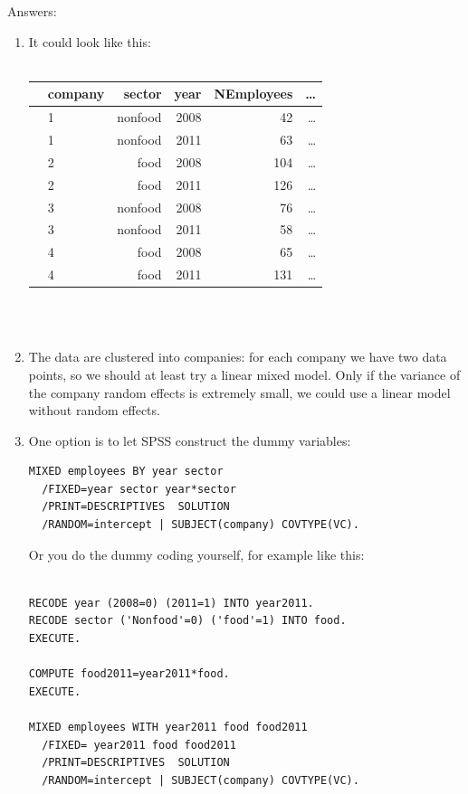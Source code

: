\documentclass[]{report}\usepackage[]{graphicx}\usepackage[]{color}
\begin{document}
Answers:
\\
\begin{enumerate}
\item It could look like this:
\\
\\
\begin{tabular}{llrrrr}
   & company & sector  & year & NEmployees  & \dots  \\ \hline
  & 1 & nonfood  & 2008 & 42  & \dots  \\
  & 1 & nonfood  & 2011 & 63  & \dots  \\
  & 2 & food  & 2008 & 104  & \dots  \\
  & 2 & food  & 2011 & 126  & \dots  \\
  & 3 & nonfood  & 2008 & 76  & \dots  \\
  & 3 & nonfood  & 2011 & 58  & \dots  \\
  & 4 & food  & 2008 & 65  & \dots  \\
  & 4 & food  & 2011 & 131  & \dots  \\
\end{tabular}
\\
\\
\item The data are clustered into companies: for each company we have two data points, so we should at least try a linear mixed model. Only if the variance of the company random effects is extremely small, we could use a linear model without random effects.
\item One option is to let SPSS construct the dummy variables:

\begin{verbatim}
MIXED employees BY year sector 
  /FIXED=year sector year*sector
  /PRINT=DESCRIPTIVES  SOLUTION
  /RANDOM=intercept | SUBJECT(company) COVTYPE(VC).
\end{verbatim}

Or you do the dummy coding yourself, for example like this:

\begin{verbatim}

RECODE year (2008=0) (2011=1) INTO year2011.
RECODE sector ('Nonfood'=0) ('food'=1) INTO food.
EXECUTE.

COMPUTE food2011=year2011*food.
EXECUTE.

MIXED employees WITH year2011 food food2011
  /FIXED= year2011 food food2011
  /PRINT=DESCRIPTIVES  SOLUTION
  /RANDOM=intercept | SUBJECT(company) COVTYPE(VC).
\end{verbatim}


\end{enumerate}
\end{document}
